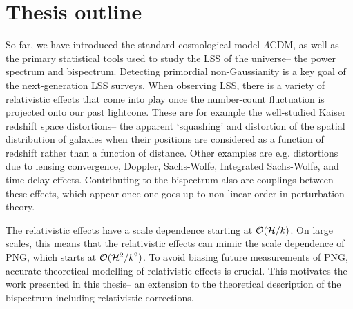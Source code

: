 \section{Thesis outline}

So far, we have introduced the standard cosmological model $\Lambda$CDM, as well as the primary statistical tools used to study the LSS of the universe-- the power spectrum and bispectrum. Detecting primordial non-Gaussianity is a key goal of the next-generation LSS surveys. When observing LSS, there is a variety of relativistic effects that come into play once the number-count fluctuation is projected onto our past lightcone. These are for example the well-studied Kaiser redshift space distortions-- the apparent `squashing' and distortion of the spatial distribution of galaxies when their positions are considered as a function of redshift rather than a function of distance. Other examples are e.g. distortions due to lensing convergence, Doppler, Sachs-Wolfe, Integrated Sachs-Wolfe, and time delay effects. Contributing to the bispectrum also are couplings between these effects, which appear once one goes up to non-linear order in perturbation theory. 

The relativistic effects have a scale dependence starting at $\mathcal{O}(\mathcal{H}/k)$. On large scales, this means that the relativistic effects can mimic the scale dependence of PNG, which starts at $\mathcal{O}(\mathcal{H}^2/k^2)$. To avoid biasing future measurements of PNG, accurate theoretical modelling of relativistic effects is crucial. This motivates the work presented in this thesis-- an extension to the theoretical description of the bispectrum including relativistic corrections.

